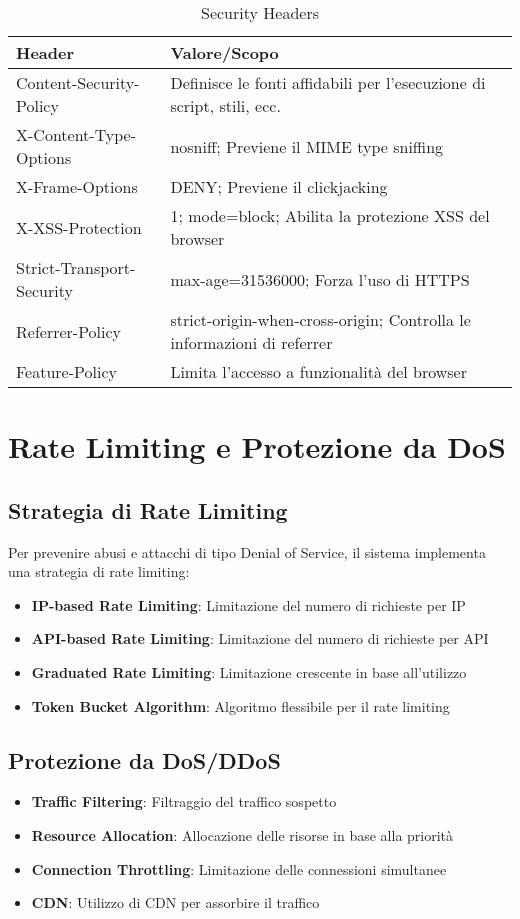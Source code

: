 \begin{table}[H]
\centering
\begin{tabular}{|l|l|}
\hline
\textbf{Header} & \textbf{Valore/Scopo} \\
\hline
Content-Security-Policy & Definisce le fonti affidabili per l'esecuzione di script, stili, ecc. \\
\hline
X-Content-Type-Options & nosniff; Previene il MIME type sniffing \\
\hline
X-Frame-Options & DENY; Previene il clickjacking \\
\hline
X-XSS-Protection & 1; mode=block; Abilita la protezione XSS del browser \\
\hline
Strict-Transport-Security & max-age=31536000; Forza l'uso di HTTPS \\
\hline
Referrer-Policy & strict-origin-when-cross-origin; Controlla le informazioni di referrer \\
\hline
Feature-Policy & Limita l'accesso a funzionalità del browser \\
\hline
\end{tabular}
\caption{Security Headers}
\label{table:security-headers}
\end{table}

\section{Rate Limiting e Protezione da DoS}

\subsection{Strategia di Rate Limiting}
Per prevenire abusi e attacchi di tipo Denial of Service, il sistema implementa una strategia di rate limiting:

\begin{itemize}
    \item \textbf{IP-based Rate Limiting}: Limitazione del numero di richieste per IP
    \item \textbf{API-based Rate Limiting}: Limitazione del numero di richieste per API
    \item \textbf{Graduated Rate Limiting}: Limitazione crescente in base all'utilizzo
    \item \textbf{Token Bucket Algorithm}: Algoritmo flessibile per il rate limiting
\end{itemize}

\subsection{Protezione da DoS/DDoS}
\begin{itemize}
    \item \textbf{Traffic Filtering}: Filtraggio del traffico sospetto
    \item \textbf{Resource Allocation}: Allocazione delle risorse in base alla priorità
    \item \textbf{Connection Throttling}: Limitazione delle connessioni simultanee
    \item \textbf{CDN}: Utilizzo di CDN per assorbire il traffico
\end{itemize}

